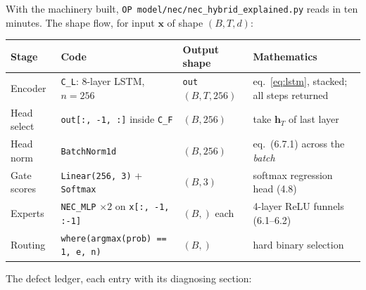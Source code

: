 \documentclass[11pt]{article}
\numberwithin{equation}{section}
\theoremstyle{plain}
\theoremstyle{definition}
\theoremstyle{remark}
\newcommand{\x}{\bm{x}}
\newcommand{\bh}{\bm{h}}
\begin{document}
With the machinery built, \texttt{OP model/nec/nec\_hybrid\_explained.py} reads in ten minutes. The shape flow, for input $\x$ of shape $(B, T, d)$:

\begin{center}
\small
\begin{tabular}{@{}llll@{}}
\toprule
Stage & Code & Output shape & Mathematics \\
\midrule
Encoder & \texttt{C\_L}: 8-layer LSTM, $n = 256$ & \texttt{out} $(B, T, 256)$ & eq.\ \eqref{eq:lstm}, stacked; all steps returned \\
Head select & \texttt{out[:, -1, :]} inside \texttt{C\_F} & $(B, 256)$ & take $\bh_T$ of last layer \\
Head norm & \texttt{BatchNorm1d} & $(B, 256)$ & eq.\ (6.7.1) across the \emph{batch} \\
Gate scores & \texttt{Linear(256, 3)} + \texttt{Softmax} & $(B, 3)$ & softmax regression head (4.8) \\
Experts & \texttt{NEC\_MLP} $\times 2$ on \texttt{x[:, -1, :-1]} & $(B,)$ each & 4-layer ReLU funnels (6.1--6.2) \\
Routing & \texttt{where(argmax(prob) == 1, e, n)} & $(B,)$ & hard binary selection \\
\bottomrule
\end{tabular}
\end{center}

The defect ledger, each entry with its diagnosing section:
\end{document}
